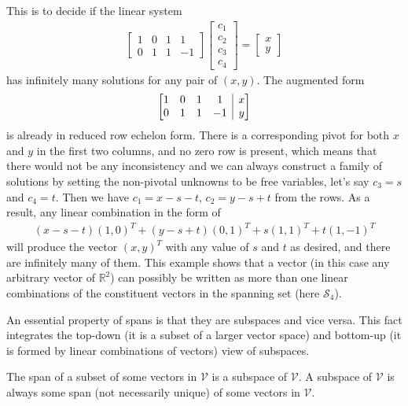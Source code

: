 \begin{solution}
This is to decide if the linear system
\begin{align*}
\begin{bmatrix}
1 & 0 & 1 & 1 \\
0 & 1 & 1 & -1
\end{bmatrix}
\begin{bmatrix}
c_1 \\
c_2 \\
c_3 \\
c_4
\end{bmatrix}
=
\begin{bmatrix}
x \\
y
\end{bmatrix}    
\end{align*}
has infinitely many solutions for any pair of $(x,y)$. The augmented form
\begin{align*}
\left[\begin{array}{@{}cccc|c@{}}
1 & 0 & 1 & 1 & x \\
0 & 1 & 1 & -1 & y
\end{array}\right]
\end{align*}
is already in reduced row echelon form. There is a corresponding pivot for both $x$ and $y$ in the first two columns, and no zero row is present, which means that there would not be any inconsistency and we can always construct a family of solutions by setting the non-pivotal unknowns to be free variables, let's say $c_3 = s$ and $c_4 = t$. Then we have $c_1 = x - s - t$, $c_2 = y - s + t$ from the rows. As a result, any linear combination in the form of
\begin{align*}
(x-s-t)(1,0)^T + (y-s+t)(0,1)^T + s(1,1)^T + t(1,-1)^T
\end{align*}
will produce the vector $(x,y)^T$ with any value of $s$ and $t$ as desired, and there are infinitely many of them. This example shows that a vector (in this case any arbitrary vector of $\mathbb{R}^2$) can possibly be written as more than one linear combinations of the constituent vectors in the spanning set (here $\mathcal{S}_4$).
\end{solution}
An essential property of spans is that they are subspaces and vice versa. This fact integrates the top-down (it is a subset of a larger vector space) and bottom-up (it is formed by linear combinations of vectors) view of subspaces.
\begin{proper}
\label{proper:subspace_n_span}
The span of a subset of some vectors in $\mathcal{V}$ is a subspace of $\mathcal{V}$. A subspace of $\mathcal{V}$ is always some span (not necessarily unique) of some vectors in $\mathcal{V}$.
\end{proper}
